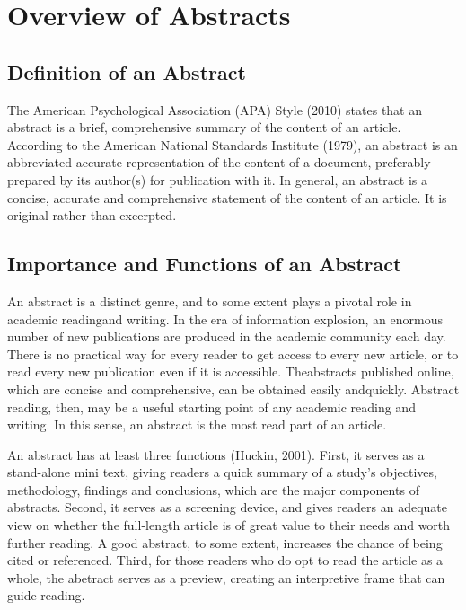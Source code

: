 \documentclass[a4paper]{ctexbook}
\begin{document}
\mainmatter


\chapter{Overview of Abstracts}\label{chapter1}
\section{Definition of an Abstract}

The American Psychological Association (APA) Style (2010) states that an abstract is a brief, comprehensive summary of the content of an article. According to the American National Standards Institute (1979), an abstract is an abbreviated accurate representation of the content of a document, preferably prepared by its author(s) for publication with it. In general, an abstract is a concise, accurate and comprehensive statement of the content of an article. It is original rather than excerpted.

\section{Importance and Functions of an Abstract}

An abstract is a distinct genre, and to some extent plays a pivotal role in academic readingand writing. In the era of information explosion, an enormous number of new publications are produced in the academic community each day. There is no practical way for every reader to get access to every new article, or to read every new publication even if it is accessible. Theabstracts published online, which are concise and comprehensive, can be obtained easily andquickly. Abstract reading, then, may be a useful starting point of any academic reading and writing. In this sense, an abstract is the most read part of an article.

An abstract has at least three functions (Huckin, 2001). First, it serves as a stand-alone mini text, giving readers a quick summary of a study's objectives, methodology, findings and conclusions, which are the major components of abstracts. Second, it serves as a screening device, and gives readers an adequate view on whether the full-length article is of great value to their needs and worth further reading. A good abstract, to some extent, increases the chance of being cited or referenced. Third, for those readers who do opt to read the article as a whole, the abetract serves as a preview, creating an interpretive frame that can guide reading.
\end{document}
